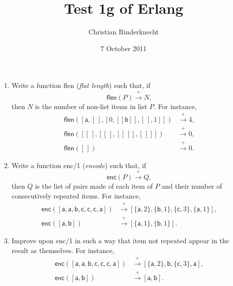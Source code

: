 \documentclass[11pt,a4paper]{article}
\title{Test 1g of \textsf{Erlang}}
\author{Christian Rinderknecht}
\date{7 October 2011}
\newcommand\fun[1]{\textsf{#1}}
\begin{document}
\maketitle

\thispagestyle{empty}


\begin{enumerate}

  \item Write a function \fun{flen} (\emph{flat length}) such that, if
    \[\fun{flen}(P) \xrightarrow{+} N,\]
    then \(N\) is the number of non-list items in list \(P\). For
    instance,
    \begin{align*}
    \fun{flen}([\fun{a},[\,],[0,[[\fun{b}]],[\,],1]])
    &\xrightarrow{+} 4,\\
    \fun{flen}([[\,],[[\,],[[\,]],[\,]]]) &\xrightarrow{+} 0,\\
    \fun{flen}([\,]) &\xrightarrow{+} 0.
    \end{align*}

  \item Write a function \fun{enc/1} (\emph{encode}) such that, if
    \[\fun{enc}(P) \xrightarrow{+} Q,\] then \(Q\) is the list of
    pairs made of each item of \(P\) and their number of consecutively
    repeated items. For instance,
    \begin{align*}
      \fun{enc}([\fun{a}, \fun{a}, \fun{b}, \fun{c}, \fun{c}, \fun{c},
        \fun{a}]) &\xrightarrow{+} [\{\fun{a},2\}, \{\fun{b},1\},
        \{\fun{c},3\}, \{\fun{a},1\}],\\
      \fun{enc}([\fun{a},\fun{b}]) &\xrightarrow{+} [\{\fun{a},1\},
        \{\fun{b},1\}].
    \end{align*}

  \item Improve upon \fun{enc/1} in such a way that item not repeated
    appear in the result as themselves. For instance,
    \begin{align*}
      \fun{enc}([\fun{a}, \fun{a}, \fun{b}, \fun{c}, \fun{c}, \fun{c},
        \fun{a}]) &\xrightarrow{+} [\{\fun{a},2\}, \fun{b},
        \{\fun{c},3\}, \fun{a}],\\
      \fun{enc}([\fun{a},\fun{b}]) &\xrightarrow{+} [\fun{a},
        \fun{b}].
    \end{align*}

\end{enumerate}
\end{document}
